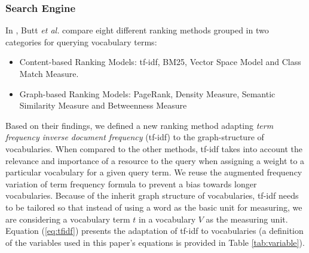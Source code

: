 \documentclass{iosart2c}
\begin{document}
\subsubsection{Search Engine}\label{sssec:search}
In \cite{butt2014}, Butt \emph{et al.} compare eight different ranking methods grouped in two categories for querying vocabulary terms:
\begin{itemize}
	\item Content-based Ranking Models: tf-idf, BM25, Vector Space Model and Class Match Measure.
	\item Graph-based Ranking Models: PageRank, Density Measure, Semantic Similarity Measure and Betweenness Measure
\end{itemize}
Based on their findings, we defined a new ranking method adapting \emph{term frequency inverse document frequency} (tf-idf) to the graph-structure of vocabularies. When compared to the other methods, tf-idf takes into account the relevance and importance of a resource to the query when assigning a weight to a particular vocabulary for a given query term. We reuse the augmented frequency variation of term frequency formula to prevent a bias towards longer vocabularies. Because of the inherit graph structure of vocabularies, tf-idf needs to be tailored so that instead of using a word as the basic unit for measuring, we are considering a vocabulary term $t$ in a vocabulary $V$ as the measuring unit. Equation (\ref{eq:tfidf}) presents the adaptation of tf-idf to vocabularies (a definition of the variables used in this paper's equations is provided in Table \ref{tab:variable}). 
\end{document}
